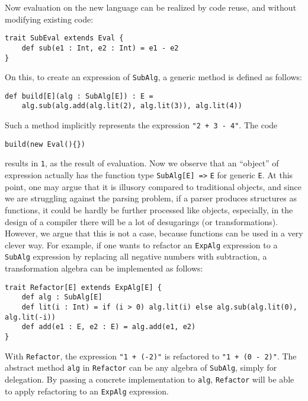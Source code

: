 Now evaluation on the new language can be realized by code reuse, and without modifying existing code:
\begin{lstlisting}
trait SubEval extends Eval {
    def sub(e1 : Int, e2 : Int) = e1 - e2
}
\end{lstlisting}
On this, to create an expression of \lstinline{SubAlg}, a generic method is defined as follows:
\begin{lstlisting}
def build[E](alg : SubAlg[E]) : E =
    alg.sub(alg.add(alg.lit(2), alg.lit(3)), alg.lit(4))
\end{lstlisting}
Such a method implicitly represents the expression \lstinline{"2 + 3 - 4"}. The code
\begin{lstlisting}
build(new Eval(){})
\end{lstlisting}
results in \lstinline{1}, as the result of evaluation. Now we observe that an ``object'' of expression actually
has the function type \lstinline{SubAlg[E] =>} \lstinline{E} for generic \lstinline{E}. At this point, one may argue
that it is illusory compared to traditional objects, and since we are struggling against the parsing problem, if a parser
produces structures as functions, it could be hardly be further processed like objects, especially, in the design of a compiler
there will be a lot of desugarings (or transformations). However, we argue that this is not a case, because functions can be used
in a very clever way. For example, if one wants to refactor an \lstinline{ExpAlg} expression to a \lstinline{SubAlg} expression by
replacing all negative numbers with subtraction, a transformation algebra can be implemented as follows:
\begin{lstlisting}
trait Refactor[E] extends ExpAlg[E] {
    def alg : SubAlg[E]
    def lit(i : Int) = if (i > 0) alg.lit(i) else alg.sub(alg.lit(0), alg.lit(-i))
    def add(e1 : E, e2 : E) = alg.add(e1, e2)
}
\end{lstlisting}
With \lstinline{Refactor}, the expression \lstinline{"1 + (-2)"} is refactored to \lstinline{"1 + (0 - 2)"}. The abstract method
\lstinline{alg} in \lstinline{Refactor} can be any algebra of \lstinline{SubAlg}, simply for delegation. By passing a concrete implementation
to \lstinline{alg}, \lstinline{Refactor} will be able to apply refactoring to an \lstinline{ExpAlg} expression.